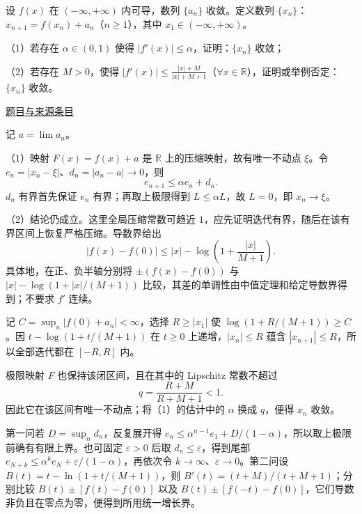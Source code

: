 \documentclass[UTF8,12pt,a4paper,fontset=fandol]{ctexart}
\begin{document}
\begin{example}[来源序号7]\label{ex:fin17-high:7}\label{pr:fin17-high:7}

设 $f(x)$ 在 $(-\infty,+\infty)$ 内可导，数列 $\{a_n\}$ 收敛。定义数列 $\{x_n\}$：$x_{n+1}=f(x_n)+a_n$（$n\ge1$），其中 $x_1\in(-\infty,+\infty)$。

（1）若存在 $\alpha\in(0,1)$ 使得 $|f'(x)|\le\alpha$，证明：$\{x_n\}$ 收敛；

（2）若存在 $M>0$，使得 $|f'(x)|\le\frac{|x|+M}{|x|+M+1}$（$\forall x\in\mathbb R$），证明或举例否定：$\{x_n\}$ 收敛。

\par\href{https://github.com/lzxcr/cmc-mathematics/blob/64916fa1fdbc3e444a652eca204d5669058ee321/src/problems/finals/17/07.md}{题目与来源条目}

\end{example}

\begin{solve}\label{ans:fin17-high:7}

记 $a=\lim a_n$。

（1）映射 $F(x)=f(x)+a$ 是 $\mathbb R$ 上的压缩映射，故有唯一不动点 $\xi$。令 $e_n=|x_n-\xi|$、$d_n=|a_n-a|\to0$，则
\[
e_{n+1}\le\alpha e_n+d_n.
\]
$d_n$ 有界首先保证 $e_n$ 有界；再取上极限得到 $L\le\alpha L$，故 $L=0$，即 $x_n\to\xi$。

（2）结论仍成立。这里全局压缩常数可趋近 $1$，应先证明迭代有界，随后在该有界区间上恢复严格压缩。导数界给出
\[
|f(x)-f(0)|\le |x|-\log\left(1+\frac{|x|}{M+1}\right).
\]
具体地，在正、负半轴分别将 $\pm(f(x)-f(0))$ 与 $|x|-\log(1+|x|/(M+1))$ 比较，其差的单调性由中值定理和给定导数界得到；不要求 $f'$ 连续。

记 $C=\sup_n|f(0)+a_n|<\infty$，选择 $R\ge|x_1|$ 使 $\log(1+R/(M+1))\ge C$。因 $t-\log(1+t/(M+1))$ 在 $t\ge0$ 上递增，$|x_n|\le R$ 蕴含 $|x_{n+1}|\le R$，所以全部迭代都在 $[-R,R]$ 内。

极限映射 $F$ 也保持该闭区间，且在其中的 Lipschitz 常数不超过
\[
q=\frac{R+M}{R+M+1}<1.
\]
因此它在该区间有唯一不动点；将（1）的估计中的 $\alpha$ 换成 $q$，便得 $x_n$ 收敛。

第一问若 $D=\sup_nd_n$，反复展开得 $e_n\le\alpha^{n-1}e_1+D/(1-\alpha)$，所以取上极限前确有有限上界。也可固定 $\varepsilon>0$ 后取 $d_n\le\varepsilon$，得到尾部 $e_{N+k}\le\alpha^ke_N+\varepsilon/(1-\alpha)$，再依次令 $k\to\infty$、$\varepsilon\to0$。第二问设 $B(t)=t-\ln(1+t/(M+1))$，则 $B'(t)=(t+M)/(t+M+1)$；分别比较 $B(t)\pm[f(t)-f(0)]$ 以及 $B(t)\pm[f(-t)-f(0)]$，它们导数非负且在零点为零，便得到所用统一增长界。

\end{solve}
\end{document}
